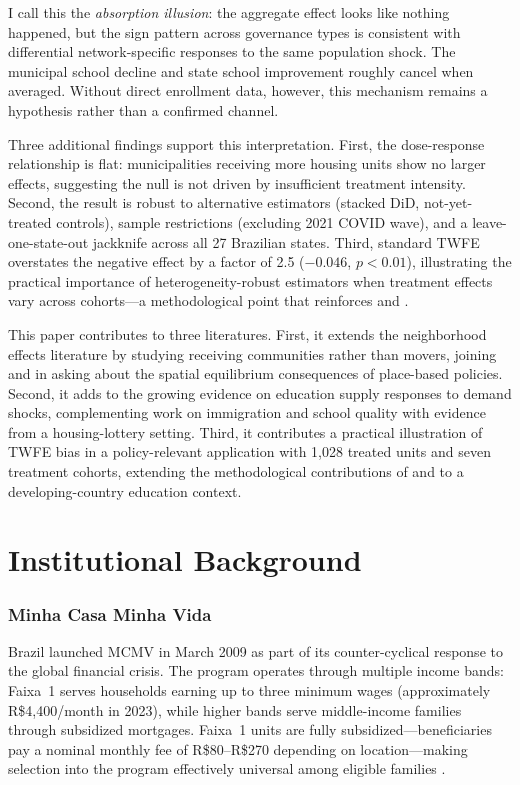 \documentclass[12pt]{article}
\begin{document}
I call this the \textit{absorption illusion}: the aggregate effect looks like nothing happened, but the sign pattern across governance types is consistent with differential network-specific responses to the same population shock. The municipal school decline and state school improvement roughly cancel when averaged. Without direct enrollment data, however, this mechanism remains a hypothesis rather than a confirmed channel.

Three additional findings support this interpretation. First, the dose-response relationship is flat: municipalities receiving more housing units show no larger effects, suggesting the null is not driven by insufficient treatment intensity. Second, the result is robust to alternative estimators (stacked DiD, not-yet-treated controls), sample restrictions (excluding 2021 COVID wave), and a leave-one-state-out jackknife across all 27 Brazilian states. Third, standard TWFE overstates the negative effect by a factor of 2.5 ($-0.046$, $p < 0.01$), illustrating the practical importance of heterogeneity-robust estimators when treatment effects vary across cohorts---a methodological point that reinforces \citet{goodman2021difference} and \citet{dechaisemartin2020two}.

This paper contributes to three literatures. First, it extends the neighborhood effects literature by studying receiving communities rather than movers, joining \citet{aliprantis2019neighborhood} and \citet{chyn2018moved} in asking about the spatial equilibrium consequences of place-based policies. Second, it adds to the growing evidence on education supply responses to demand shocks, complementing work on immigration and school quality \citep{duflo2001schooling, hoxby2000does, hunt2017effect} with evidence from a housing-lottery setting. Third, it contributes a practical illustration of TWFE bias in a policy-relevant application with 1,028 treated units and seven treatment cohorts, extending the methodological contributions of \citet{callaway2021difference} and \citet{sun2021estimating} to a developing-country education context.


\section{Institutional Background}

\subsubsection*{Minha Casa Minha Vida} Brazil launched MCMV in March 2009 as part of its counter-cyclical response to the global financial crisis. The program operates through multiple income bands: Faixa~1 serves households earning up to three minimum wages (approximately R\$4,400/month in 2023), while higher bands serve middle-income families through subsidized mortgages. Faixa~1 units are fully subsidized---beneficiaries pay a nominal monthly fee of R\$80--R\$270 depending on location---making selection into the program effectively universal among eligible families \citep{cardoso2013programa}.
\end{document}
